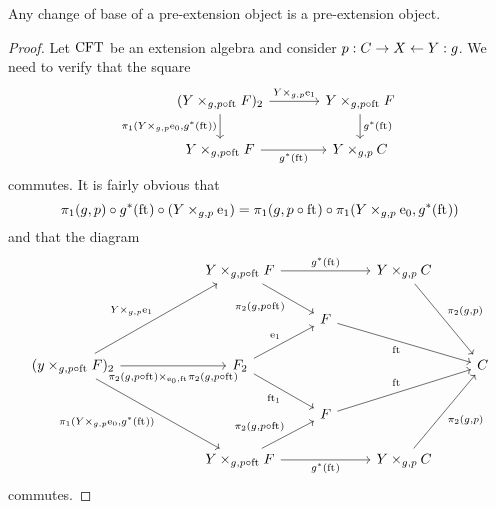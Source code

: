 \begin{lem}\label{cobesys-preext}
Any change of base of a pre-extension object is a pre-extension object.
\end{lem}

\begin{proof}
Let $\mathrm{CFT}$ be an extension algebra and consider $p:C\rightarrow X\leftarrow Y:g$.
We need to verify that the square
\begin{equation*}
\begin{tikzcd}[column sep=large]
(\pullback{Y}{\stesysf}{g}{p\circ\eft})_2
  \ar{r}{\cobesys{Y}{\efamext}{g}{p}} 
  \ar{d}[swap]{\pullbackpr{1}{\cobesys{Y}{\ectxext}{g}{p}}{g^\ast(\eft)}} 
  & 
\pullback{Y}{\stesysf}{g}{p\circ\eft}
  \ar{d}{g^\ast(\eft)}
  \\
\pullback{Y}{\stesysf}{g}{p\circ\eft}
  \ar{r}[swap]{g^\ast(\eft)} 
  & 
\pullback{Y}{\stesysc}{g}{p}
\end{tikzcd}
\end{equation*}
commutes. It is fairly obvious that
\begin{equation*}
\pullbackpr{1}{g}{p}\circ g^\ast(\eft)\circ (\cobesys{Y}{\efamext}{g}{p})
  =
\pullbackpr{1}{g}{p\circ\eft}\circ \pullbackpr{1}{\cobesys{Y}{\ectxext}{g}{p}}{g^\ast(\eft)}
\end{equation*}
and that the diagram
\begin{equation*}
\begin{tikzcd}
  {}&
  {}&
\pullback{Y}{\stesysf}{g}{p\circ\eft}
  \ar{rr}{g^\ast(\eft)}
  \ar{dr}[swap]{\pullbackpr{2}{g}{p\circ\eft}}
  &
  {}&
\pullback{Y}{\stesysc}{g}{p}
  \ar{ddr}{\pullbackpr{2}{g}{p}}
  \\
  {}&
  {}&
  {}&
\stesysf
  \ar{drr}[swap]{\eft}
  \\
(\pullback{y}{\stesysf}{g}{p\circ\eft})_2
  \ar{uurr}{\cobesys{Y}{\efamext}{g}{p}}
  \ar{rr}[swap,yshift=-.5ex]{\pullback{\pullbackpr{2}{g}{p\circ\eft}}{\pullbackpr{2}{g}{p\circ\eft}}{\ectxext}{\eft}}
  \ar{ddrr}[swap]{\pullbackpr{1}{\cobesys{Y}{\ectxext}{g}{p}}{g^\ast(\eft)}}
  &
  {}&
\stesysf_2
  \ar{ur}{\efamext}
  \ar{dr}[swap]{\eft[1]}
  &
  {}&
  {}&
\stesysc
  \\
  {}&
  {}&
  {}&
\stesysf
  \ar{urr}{\eft}
  \\
  {}&
  {}&
\pullback{Y}{\stesysf}{g}{p\circ\eft}
  \ar{rr}[swap]{g^\ast(\eft)}
  \ar{ur}{\pullbackpr{2}{g}{p\circ\eft}}
  &
  {}&
\pullback{Y}{\stesysc}{g}{p}
  \ar{uur}[swap]{\pullbackpr{2}{g}{p}}
\end{tikzcd}
\end{equation*}
commutes.
\end{proof}

